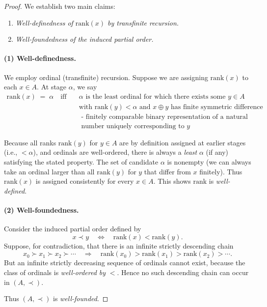 \begin{proof}
    We establish two main claims:
    \begin{enumerate}
    \item \emph{Well-definedness of $\mathrm{rank}(x)$ by transfinite recursion.}
    \item \emph{Well-foundedness of the induced partial order.}
    \end{enumerate}
    
    \paragraph{(1) Well-definedness.}
    We employ ordinal (transfinite) recursion. Suppose we are assigning $\mathrm{rank}(x)$
    to each $x \in A$. At stage $\alpha$, we say
    \begin{align*}
        \mathrm{rank}(x) \;=\; \alpha
        \quad\text{iff}\quad
        &\alpha \text{ is the least ordinal for which there exists some } y \in A \\
        &\text{with } \mathrm{rank}(y) < \alpha \text{ and } x \oplus y \text{ has finite symmetric difference}\\
        &\text{ - finitely comparable binary representation of a natural}\\
        &\text{ number uniquely corresponding to } y
    \end{align*}

    Because all ranks $\mathrm{rank}(y)$ for $y \in A$ are by definition assigned at earlier
    stages (i.e., $<\alpha$), and ordinals are well-ordered, there is always a
    \emph{least} $\alpha$ (if any) satisfying the stated property. The set of candidate $\alpha$
    is nonempty (we can always take an ordinal larger than all $\mathrm{rank}(y)$ for
    $y$ that differ from $x$ finitely). Thus $\mathrm{rank}(x)$ is assigned consistently
    for every $x \in A$. This shows $\mathrm{rank}$ is \emph{well-defined}.
    
    \paragraph{(2) Well-foundedness.}
    Consider the induced partial order defined by
    \[
      x \prec y \quad\Longleftrightarrow\quad \mathrm{rank}(x) < \mathrm{rank}(y).
    \]
    Suppose, for contradiction, that there is an infinite strictly descending chain
    \[
      x_0 \succ x_1 \succ x_2 \succ \cdots
      \quad\Longrightarrow\quad
      \mathrm{rank}(x_0) > \mathrm{rank}(x_1) > \mathrm{rank}(x_2) > \cdots.
    \]
    But an infinite strictly decreasing sequence of ordinals cannot exist, because
    the class of ordinals is \emph{well-ordered by} $<$. Hence no such descending chain
    can occur in $(A,\prec)$.
    
    Thus $(A,\prec)$ is \emph{well-founded}.
\end{proof}

